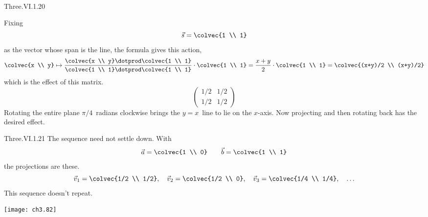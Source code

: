 \begin{ans}{Three.VI.1.20}
      \begin{exparts}
        \partsitem Fixing
          \begin{equation*}
            \vec{s}=\colvec{1 \\ 1}
          \end{equation*}
          as the vector whose span is the line, the formula gives this
          action,
          \begin{equation*}
            \colvec{x \\ y}
             \mapsto
            \frac{\colvec{x \\ y}\dotprod\colvec{1 \\ 1}}{%
                  \colvec{1 \\ 1}\dotprod\colvec{1 \\ 1}}\cdot\colvec{1 \\ 1}
            =\frac{x+y}{2}\cdot\colvec{1 \\ 1}
            =\colvec{(x+y)/2 \\ (x+y)/2}
          \end{equation*}
          which is the effect of this matrix.
          \begin{equation*}
            \begin{pmatrix}
              1/2  &1/2  \\
              1/2  &1/2
            \end{pmatrix}
          \end{equation*}
        \partsitem Rotating the entire plane $\pi/4$~radians clockwise
          brings the $y=x$~line to lie on the $x$-axis.
          Now projecting and then rotating back has the desired effect.
      \end{exparts}
    
\end{ans}
\begin{ans}{Three.VI.1.21}
      The sequence need not settle down.
      With
      \begin{equation*}
        \vec{a}=\colvec{1 \\ 0}
        \qquad
        \vec{b}=\colvec{1 \\ 1}
      \end{equation*}
      the projections are these.
      \begin{equation*}
        \vec{v}_1=\colvec{1/2 \\ 1/2},
        \quad
        \vec{v}_2=\colvec{1/2 \\ 0},
        \quad
        \vec{v}_3=\colvec{1/4 \\ 1/4},
        \quad
        \ldots
      \end{equation*}
      This sequence doesn't repeat.
      \begin{center}  \small
        \texttt{[image: ch3.82]}
      \end{center}
      
\end{ans}
